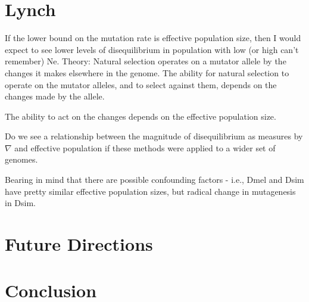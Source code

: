 \section{Lynch}

If the lower bound on the mutation rate is effective population size, then I would expect to see lower levels of disequilibrium in population with low (or high can't remember) Ne. 
Theory: Natural selection operates on a mutator allele by the changes it makes elsewhere in the genome. 
The ability for natural selection to operate on the mutator alleles, and to select against them, depends on the changes made by the allele. 

The ability to act on the changes depends on the effective population size. 

Do we see a relationship between the magnitude of disequilibrium as measures by $\nabla$ and effective population if these methods were applied to a wider set of genomes. 

Bearing in mind that there are possible confounding factors - i.e., Dmel and Dsim have pretty similar effective population sizes, but radical change in mutagenesis in Dsim. 



\section{Future Directions}


\section{Conclusion}